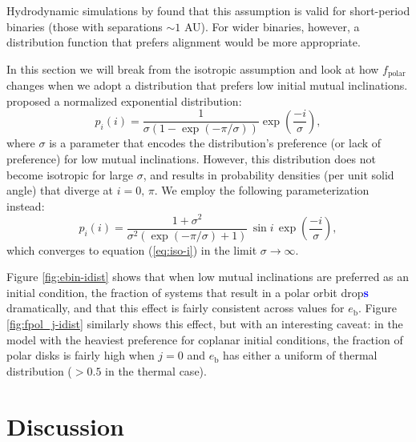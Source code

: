 \documentclass[twocolumn,linenumbers]{aastex631}
\newcommand{\RR}[1]{\textcolor{blue}{\bf#1}} %
\begin{document}
Hydrodynamic simulations by \citet{elsender2023} found that this assumption is valid for short-period binaries (those with separations $\sim 1$ AU). For wider binaries, however, a distribution function that prefers alignment would be more appropriate.

In this section we will break from the isotropic assumption and look at how $f_\text{polar}$ changes when we adopt a distribution that prefers low initial mutual inclinations. \citet{ceppi2024} proposed a normalized exponential distribution:
\begin{equation}
    p_i(i) = \frac{1}{\sigma(1-\exp{(-\pi/\sigma)})} \exp{\left(\frac{-i}{\sigma}\right)},
\end{equation}
where $\sigma$ is a parameter that encodes the distribution's preference (or lack of preference) for low mutual inclinations.
However, this distribution does not become isotropic for large $\sigma$, and results in probability densities (per unit solid angle) that diverge at $i=0,\,\pi$. We employ the following parameterization instead:
\begin{equation}
    \label{eq:idist}
    p_i(i) = \frac{1+\sigma^2}{\sigma^2 (\exp{(-\pi/\sigma)}+1)}\,\sin{i}\,\exp{\left(\frac{-i}{\sigma}\right)},
\end{equation}
which converges to equation (\ref{eq:iso-i}) in the limit $\sigma \rightarrow \infty$.

Figure \ref{fig:ebin-idist} shows that when low mutual inclinations are preferred as an initial condition, the fraction of systems that result in a polar orbit drop\RR{s} dramatically, and that this effect is fairly consistent across values for $e_\text{b}$. Figure \ref{fig:fpol_j-idist} similarly shows this effect, but with an interesting caveat: in the model with the heaviest preference for coplanar initial conditions, the fraction of polar disks is fairly high when $j=0$ and $e_\text{b}$ has either a uniform of thermal distribution ($>0.5$ in the thermal case).

\section{Discussion}
\label{sec:discussion}
\end{document}

